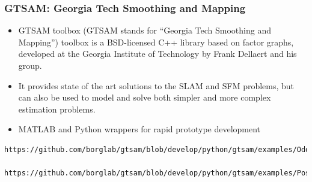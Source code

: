 \begin{frame}[fragile]
    \frametitle{GTSAM: Georgia Tech Smoothing and Mapping}

    \begin{itemize}
        \item GTSAM toolbox (GTSAM stands for ``Georgia Tech Smoothing and Mapping'') toolbox is a BSD-licensed C++ library based on factor graphs, developed at the Georgia Institute of Technology by Frank Dellaert and his group.
        \item It provides state of the art solutions to the SLAM and SFM problems, but can also be used to model and solve both simpler and more complex estimation problems.
        \item MATLAB and Python wrappers for rapid prototype development
    \end{itemize}


\begin{lstlisting}[style=bash] 
    https://github.com/borglab/gtsam/blob/develop/python/gtsam/examples/OdometryExample.py
    https://github.com/borglab/gtsam/blob/develop/python/gtsam/examples/Pose2SLAMExample.ipynb
\end{lstlisting}

\end{frame}

